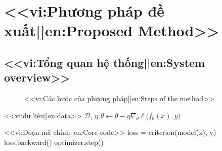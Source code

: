 \chapter{<<vi:Phương pháp đề xuất||en:Proposed Method>>}
\label{ch:method}

\section{<<vi:Tổng quan hệ thống||en:System overview>>}
\begin{figure}
  \centering
  \caption{<<vi:Các bước của phương pháp||en:Steps of the method>>}
  \label{fig:pipeline}
\end{figure}

\begin{algorithm}
  \caption{<<vi:Huấn luyện||en:Training>>}
  \begin{algorithmic}[1]
    \Require <<vi:dữ liệu||en:data>> $\mathcal{D}$, $\eta$
      \State $\theta \gets \theta - \eta\nabla_\theta \ell\big(f_\theta(x), y\big)$
    \EndFor
  \end{algorithmic}
\end{algorithm}

\begin{lkcode}[Python]{<<vi:Đoạn mã chính||en:Core code>>}
loss = criterion(model(x), y)
loss.backward()
optimizer.step()
\end{lkcode}
